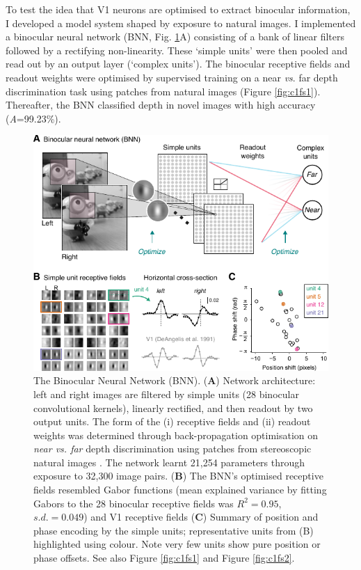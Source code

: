 {To test the idea that V1 neurons are optimised to extract binocular information, I developed a model system shaped by exposure to natural images. I implemented a binocular neural network (BNN, Fig. \ref{fig:c1f2}A) consisting of a bank of linear filters followed by a rectifying non-linearity. These `simple units' were then pooled and read out by an output layer (`complex units'). The binocular receptive fields and readout weights were optimised by supervised training on a near {\it vs}. far depth discrimination task using patches from natural images (Figure \ref{fig:c1fs1}). Thereafter, the BNN classified depth in novel images with high accuracy ({\it A}=99.23\%). 

\begin{figure}[!h]
  \centering
  \includegraphics{chapter1/chapter1-figs/Fig2.pdf}
  \caption[The Binocular Neural Network.]{The Binocular Neural Network (BNN). ({\bf A}) Network architecture: left and right images are filtered by simple units (28 binocular convolutional kernels), linearly rectified, and then readout by two output units. The form of the (i) receptive fields and (ii) readout weights was determined through back-propagation optimisation on {\it near vs. far} depth discrimination using patches from stereoscopic natural images \cite{Li:2014ik}. The network learnt 21,254 parameters through exposure to 32,300 image pairs. ({\bf B}) The BNN's optimised receptive fields resembled Gabor functions (mean explained variance by fitting Gabors to the 28 binocular receptive fields was $R^2=0.95$, $s.d.=0.049$) and V1 receptive fields \cite{DeAngelis:1991mb} ({\bf C}) Summary of position and phase encoding by the simple units; representative units from (B) highlighted using colour. Note very few units show pure position or phase offsets. See also Figure \ref{fig:c1fs1} and Figure \ref{fig:c1fs2}.}
  \label{fig:c1f2}
\end{figure}


}
